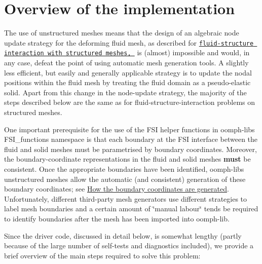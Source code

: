 \hypertarget{index_overview_implementation}{}\section{Overview of the implementation}\label{index_overview_implementation}
The use of unstructured meshes means that the design of an algebraic node update strategy for the deforming fluid mesh, as described for \href{../../fsi_collapsible_channel_algebraic/html/index.html}{\tt fluid-\/structure interaction with structured meshes, } is (almost) impossible and would, in any case, defeat the point of using automatic mesh generation tools. A slightly less efficient, but easily and generally applicable strategy is to update the nodal positions within the fluid mesh by treating the fluid domain as a pseudo-\/elastic solid. Apart from this change in the node-\/update strategy, the majority of the steps described below are the same as for fluid-\/structure-\/interaction problems on structured meshes.

One important prerequisite for the use of the F\+SI helper functions in {\ttfamily oomph-\/lib\textquotesingle{}s} {\ttfamily F\+S\+I\+\_\+functions} namespace is that each boundary at the F\+SI interface between the fluid and solid meshes must be parametrised by boundary coordinates. Moreover, the boundary-\/coordinate representations in the fluid and solid meshes {\bfseries  must } be consistent. Once the appropriate boundaries have been identified, {\ttfamily oomph-\/lib\textquotesingle{}s} unstructured meshes allow the automatic (and consistent) generation of these boundary coordinates; see \hyperlink{index_boundary_coord}{How the boundary coordinates are generated}. Unfortunately, different third-\/party mesh generators use different strategies to label mesh boundaries and a certain amount of \char`\"{}manual labour\char`\"{} tends be required to identify boundaries after the mesh has been imported into {\ttfamily oomph-\/lib}.

Since the driver code, discussed in detail below, is somewhat lengthy (partly because of the large number of self-\/tests and diagnostics included), we provide a brief overview of the main steps required to solve this problem\+: ~\newline
~\newline

